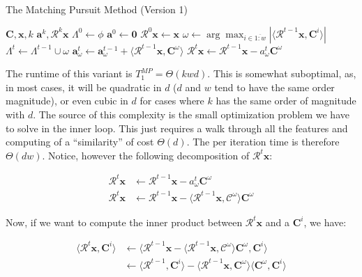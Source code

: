 \documentclass[12pt,a4paper,oneside,english]{UPBThesis}
\newcommand{\hcrange}[2]{\overline{{#1}\colon\!\!{#2}}}
\begin{document}
\begin{algorithm}
\caption{The Matching Pursuit Method (Version 1)}
\label{algo:MatchingPursuitMethodV1}
\begin{algorithmic}
\Require $\textbf{C},\textbf{x},k$
\Ensure $\textbf{a}^k,\mathcal{R}^k\textbf{x}$
\State $\Lambda^0 \gets \phi$
\State $\textbf{a}^0 \gets \textbf{0}$
\State $\mathcal{R}^0\textbf{x} \gets \textbf{x}$
\For {$t = \hcrange{1}{k}$}
\State $\omega \gets \arg \max_{i \in \hcrange{1}{w}} \left| \langle \mathcal{R}^{t-1}\textbf{x}, \textbf{C}^i \rangle \right|$
\State $\Lambda^t \gets \Lambda^{t-1} \cup \omega$
\State $\textbf{a}_\omega^t \gets \textbf{a}_\omega^{t-1} + \langle \mathcal{R}^{t-1}\textbf{x} , \textbf{C}^\omega \rangle$
\State $\mathcal{R}^t\textbf{x} \gets \mathcal{R}^{t-1}\textbf{x} - a_\omega^t\textbf{C}^\omega$
\EndFor
\end{algorithmic}
\end{algorithm}

The runtime of this variant is $T_1^{MP} = \Theta(kwd)$. This is somewhat suboptimal, as, in most cases, it will be quadratic in $d$ ($d$ and $w$ tend to have the same order magnitude), or even cubic in $d$ for cases where $k$ has the same order of magnitude with $d$. The source of this complexity is the small optimization problem we have to solve in the inner loop. This just requires a walk through all the features and computing of a ``similarity'' of cost $\Theta(d)$. The per iteration time is therefore $\Theta(dw)$. Notice, however the following decomposition of $\mathcal{R}^t\textbf{x}$:

\begin{align*}
\mathcal{R}^t\textbf{x} & \gets \mathcal{R}^{t-1}\textbf{x} - a_\omega^t\textbf{C}^\omega \\
\mathcal{R}^t\textbf{x} & \gets \mathcal{R}^{t-1}\textbf{x} - \langle \mathcal{R}^{t-1}\textbf{x}, \mathcal{C}^\omega \rangle \textbf{C}^\omega
\end{align*}

Now, if we want to compute the inner product between $\mathcal{R}^t\textbf{x}$ and a $\textbf{C}^i$, we have:

\begin{align*}
\langle \mathcal{R}^t\textbf{x}, \textbf{C}^i \rangle & \gets \langle \mathcal{R}^{t-1}\textbf{x} - \langle \mathcal{R}^{t-1}\textbf{x}, \mathcal{C}^\omega \rangle \textbf{C}^\omega , \textbf{C}^i \rangle \\
& \gets \langle \mathcal{R}^{t-1}, \textbf{C}^i \rangle - \langle \mathcal{R}^{t-1}\textbf{x}, \textbf{C}^\omega \rangle \langle \textbf{C}^\omega, \textbf{C}^i \rangle
\end{align*}
\end{document}
